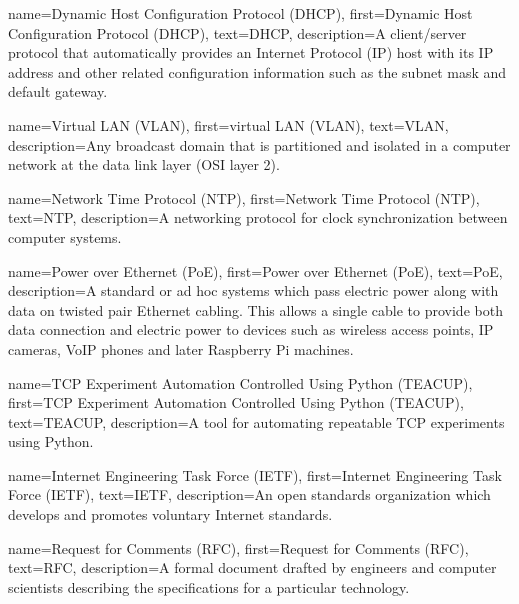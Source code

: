 {
    name={Dynamic Host Configuration Protocol (DHCP)},
    first={Dynamic Host Configuration Protocol (DHCP)},
    text={DHCP},
    description={A client/server protocol that automatically provides an Internet Protocol (IP) host with its IP address and other related configuration information such as the subnet mask and default gateway.}
}

{
    name={Virtual LAN (VLAN)},
    first={virtual LAN (VLAN)},
    text={VLAN},
    description={Any broadcast domain that is partitioned and isolated in a computer network at the data link layer (OSI layer 2).}
}

{
    name={Network Time Protocol (NTP)},
    first={Network Time Protocol (NTP)},
    text={NTP},
    description={A networking protocol for clock synchronization between computer systems.}
}

{
    name={Power over Ethernet (PoE)},
    first={Power over Ethernet (PoE)},
    text={PoE},
    description={A standard or ad hoc systems which pass electric power along with data on twisted pair Ethernet cabling. This allows a single cable to provide both data connection and electric power to devices such as wireless access points, IP cameras, VoIP phones and later Raspberry Pi machines.}
}

{
    name={TCP Experiment Automation Controlled Using Python (TEACUP)},
    first={TCP Experiment Automation Controlled Using Python (TEACUP)},
    text={TEACUP},
    description={A tool for automating repeatable TCP experiments using Python.}
}

{
    name={Internet Engineering Task Force (IETF)},
    first={Internet Engineering Task Force (IETF)},
    text={IETF},
    description={An open standards organization which develops and promotes voluntary Internet standards.}
}

{
    name={Request for Comments (RFC)},
    first={Request for Comments (RFC)},
    text={RFC},
    description={A formal document drafted by engineers and computer scientists describing the specifications for a particular technology.}
}